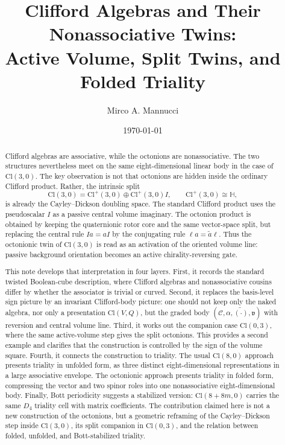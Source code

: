 \documentclass[11pt]{article}
\title{Clifford Algebras and Their Nonassociative Twins:\\
Active Volume, Split Twins, and Folded Triality}
\author{Mirco A. Mannucci}
\date{\today}
\newcommand{\Cl}{\mathrm{Cl}}
\begin{document}
\maketitle


\begin{abstract}
Clifford algebras are associative, while the octonions are nonassociative.
The two structures nevertheless meet on the same eight-dimensional linear
body in the case of $\Cl(3,0)$. The key observation is not that octonions are
hidden inside the ordinary Clifford product. Rather, the intrinsic split
\[
\Cl(3,0)=\Cl^+(3,0)\oplus \Cl^+(3,0)I,
\qquad
\Cl^+(3,0)\cong\mathbb H,
\]
is already the Cayley--Dickson doubling space. The standard Clifford product
uses the pseudoscalar $I$ as a passive central volume imaginary. The octonion
product is obtained by keeping the quaternionic rotor core and the same
vector-space split, but replacing the central rule $Ia=aI$ by the conjugating
rule $\ell a=\widetilde a\ell$. Thus the octonionic twin of $\Cl(3,0)$ is
read as an activation of the oriented volume line: passive background
orientation becomes an active chirality-reversing gate.

This note develops that interpretation in four layers. First, it records the
standard twisted Boolean-cube description, where Clifford algebras and
nonassociative cousins differ by whether the associator is trivial or curved.
Second, it replaces the basis-level sign picture by an invariant Clifford-body
picture: one should not keep only the naked algebra, nor only a presentation
$\Cl(V,Q)$, but the graded body $(\mathcal C,\alpha,\widetilde{(\cdot)},\mathfrak v)$
with reversion and central volume line. Third, it works out the companion case
$\Cl(0,3)$, where the same active-volume step gives the split octonions. This
provides a second example and clarifies that the construction is controlled by
the sign of the volume square. Fourth, it connects the construction to
triality. The usual $\Cl(8,0)$ approach presents triality in unfolded form, as
three distinct eight-dimensional representations in a large associative
envelope. The octonionic approach presents triality in folded form, compressing
the vector and two spinor roles into one nonassociative eight-dimensional body.
Finally, Bott periodicity suggests a stabilized version: $\Cl(8+8m,0)$ carries
the same $D_4$ triality cell with matrix coefficients. The contribution claimed
here is not a new construction of the octonions, but a geometric reframing of
the Cayley--Dickson step inside $\Cl(3,0)$, its split companion in $\Cl(0,3)$,
and the relation between folded, unfolded, and Bott-stabilized triality.
\end{abstract}
\end{document}
